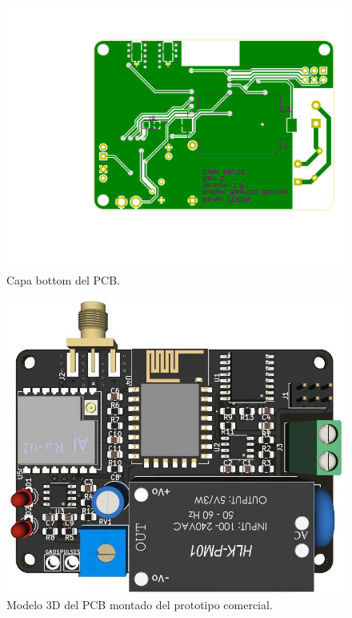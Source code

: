 \begin{figure}[h]
	\centering
	\includegraphics[scale=0.5]{./Figures/pcb_bot.pdf}
	\caption{Capa bottom del PCB.}
		\label{fig:pcbBot}
\end{figure}

\begin{figure}[h]
	\centering
	\includegraphics[scale=0.375	]{./Figures/pcb_3d.jpg}
	\caption{Modelo 3D del PCB montado del prototipo comercial.}
		\label{fig:pcb3D}
\end{figure}


